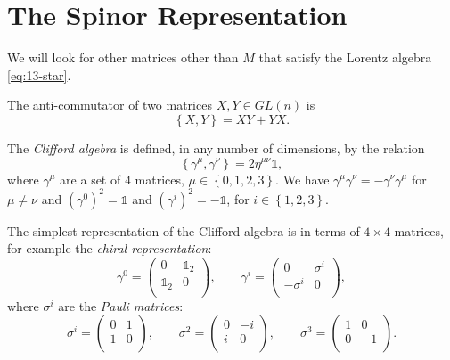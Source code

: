 
\section{The Spinor Representation}%
\label{sec:the_spinor_representation}

We will look for other matrices other than $M$ that satisfy the Lorentz algebra \eqref{eq:13-star}.

\begin{definition}[]
  The anti-commutator of two matrices $X, Y \in GL(n)$ is
  \begin{equation}
    \left\{ X, Y \right\} = X Y + Y X.
  \end{equation}
\end{definition}
\begin{definition}[]
  The \emph{Clifford algebra} is defined, in any number of dimensions, by the relation
  \begin{equation}
    \boxed{ \left\{ \gamma^{\mu}, \gamma^{\nu} \right\} = 2 \eta^{\mu\nu} \mathbb{1} },
  \end{equation}
  where $\gamma^{\mu}$ are a set of $4$ matrices, $\mu \in \left\{ 0, 1,2,3 \right\}$.
  We have $\gamma^{\mu} \gamma^{\nu} = - \gamma^{\nu} \gamma^{\mu}$ for $\mu \neq \nu$ and $(\gamma^0)^2 = \mathbb{1}$ and $(\gamma^i)^2 = -\mathbb{1}$, for $i \in \left\{ 1, 2,3 \right\}$.
\end{definition}
The simplest representation of the Clifford algebra is in terms of $4 \times 4$ matrices, for example the \emph{chiral representation}:
\begin{equation}
  \gamma^0 = 
  \begin{pmatrix}
   0 & \mathbb{1}_2 \\
   \mathbb{1}_2 & 0 \\
  \end{pmatrix}, 
  \qquad \gamma^i = 
  \begin{pmatrix}
   0 & \sigma^i \\
   -\sigma^i & 0 \\
  \end{pmatrix},
\end{equation}
where $\sigma^i$ are the \emph{Pauli matrices}:
\begin{equation}
  \sigma^i = 
  \begin{pmatrix}
   0 & 1 \\
   1 & 0 \\
  \end{pmatrix}, \qquad
  \sigma^2 =
  \begin{pmatrix}
   0 & -i \\
   i & 0 \\
  \end{pmatrix},
  \qquad \sigma^3 = 
  \begin{pmatrix}
   1 & 0 \\
   0 & -1 \\
  \end{pmatrix}.
\end{equation}
